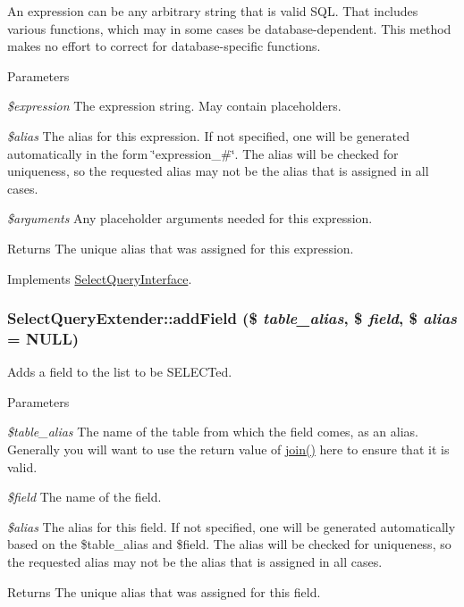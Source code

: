 An expression can be any arbitrary string that is valid SQL. That includes various functions, which may in some cases be database-\/dependent. This method makes no effort to correct for database-\/specific functions.


\begin{DoxyParams}{Parameters}
\item[{\em \$expression}]The expression string. May contain placeholders. \item[{\em \$alias}]The alias for this expression. If not specified, one will be generated automatically in the form \char`\"{}expression\_\-\#\char`\"{}. The alias will be checked for uniqueness, so the requested alias may not be the alias that is assigned in all cases. \item[{\em \$arguments}]Any placeholder arguments needed for this expression. \end{DoxyParams}
\begin{DoxyReturn}{Returns}
The unique alias that was assigned for this expression. 
\end{DoxyReturn}


Implements \hyperlink{interfaceSelectQueryInterface_a85b30bde2daad80cb614d7d1f5b8dae3}{SelectQueryInterface}.\hypertarget{classSelectQueryExtender_ab5d7e784fcc0f74caa07a53ddc423f05}{
\subsubsection[{addField}]{\setlength{\rightskip}{0pt plus 5cm}SelectQueryExtender::addField (\$ {\em table\_\-alias}, \/  \$ {\em field}, \/  \$ {\em alias} = {\ttfamily NULL})}}
\label{classSelectQueryExtender_ab5d7e784fcc0f74caa07a53ddc423f05}
Adds a field to the list to be SELECTed.


\begin{DoxyParams}{Parameters}
\item[{\em \$table\_\-alias}]The name of the table from which the field comes, as an alias. Generally you will want to use the return value of \hyperlink{classSelectQueryExtender_a6b9998d4e438ab3edc2867e32a5c120c}{join()} here to ensure that it is valid. \item[{\em \$field}]The name of the field. \item[{\em \$alias}]The alias for this field. If not specified, one will be generated automatically based on the \$table\_\-alias and \$field. The alias will be checked for uniqueness, so the requested alias may not be the alias that is assigned in all cases. \end{DoxyParams}
\begin{DoxyReturn}{Returns}
The unique alias that was assigned for this field. 
\end{DoxyReturn}



